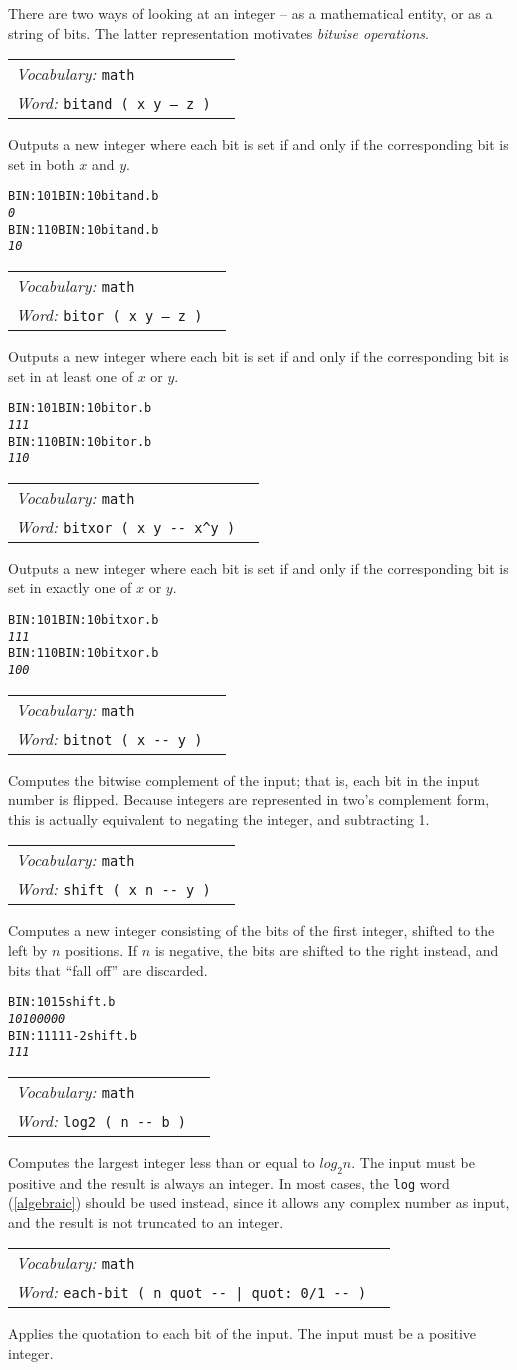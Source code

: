 \documentclass{book}
\newcommand{\vocabulary}[1]{\emph{Vocabulary:} \texttt{#1}&\\}
\newcommand{\ordinaryword}[2]{\index{\texttt{#1}}\emph{Word:} \texttt{#2}&\\}
\newcommand{\wordtable}[1]{


\begin{tabularx}{12cm}{lX}
\hline
#1
\hline
\end{tabularx}

}
\begin{document}
There are two ways of looking at an integer -- as a mathematical entity, or as a string of bits. The latter representation motivates \emph{bitwise operations}.
\wordtable{
\vocabulary{math}
\ordinaryword{bitand}{bitand ( x y -- z )}
}
Outputs a new integer where each bit is set if and only if the corresponding bit is set in both $x$ and $y$.
\begin{alltt}
BIN: 101 BIN: 10 bitand .b
\emph{0}
BIN: 110 BIN: 10 bitand .b
\emph{10}
\end{alltt}
\wordtable{
\vocabulary{math}
\ordinaryword{bitor}{bitor ( x y -- z )}
}
Outputs a new integer where each bit is set if and only if the corresponding bit is set in at least one of $x$ or $y$.
\begin{alltt}
BIN: 101 BIN: 10 bitor .b
\emph{111}
BIN: 110 BIN: 10 bitor .b
\emph{110}
\end{alltt}
\wordtable{
\vocabulary{math}
\ordinaryword{bitxor}{bitxor ( x y -{}- x\^{}y )}
}
Outputs a new integer where each bit is set if and only if the corresponding bit is set in exactly one of $x$ or $y$.
\begin{alltt}
BIN: 101 BIN: 10 bitxor .b
\emph{111}
BIN: 110 BIN: 10 bitxor .b
\emph{100}
\end{alltt}
\wordtable{
\vocabulary{math}
\ordinaryword{bitnot}{bitnot ( x -{}- y )}
}
Computes the bitwise complement of the input; that is, each bit in the input number is flipped. Because integers are represented in two's complement form, this is actually equivalent to negating the integer, and subtracting 1.
\wordtable{
\vocabulary{math}
\ordinaryword{shift}{shift ( x n -{}- y )}
}
Computes a new integer consisting of the bits of the first integer, shifted to the left by $n$ positions. If $n$ is negative, the bits are shifted to the right instead, and bits that ``fall off'' are discarded.
\begin{alltt}
BIN: 101 5 shift .b
\emph{10100000}
BIN: 11111 -2 shift .b
\emph{111}
\end{alltt}

\wordtable{
\vocabulary{math}
\ordinaryword{log2}{log2 ( n -{}- b )}
}
Computes the largest integer less than or equal to $log_2 n$. The input must be positive and the result is always an integer. In most cases, the \verb|log| word (\ref{algebraic}) should be used instead, since it allows any complex number as input, and the result is not truncated to an integer.

\wordtable{
\vocabulary{math}
\ordinaryword{each-bit}{each-bit ( n quot -{}- | quot: 0/1 -{}- )}
}
Applies the quotation to each bit of the input. The input must be a positive integer.
\end{document}
